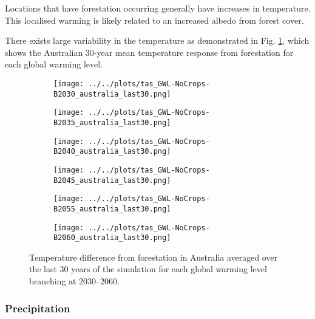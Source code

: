 \documentclass[]{article}
\begin{document}
Locations that have forestation occurring generally have increases in temperature.
This localised warming is likely related to an increased albedo from forest cover.

There exists large variability in the temperature as demonstrated in Fig. \ref{fig:tas_australia}, which shows the Australian 30-year mean temperature response from forestation for each global warming level.

\begin{figure}[H]
    \centering
    \begin{subfigure}[b]{0.4\linewidth}
        \texttt{[image: ../../plots/tas\_GWL-NoCrops-B2030\_australia\_last30.png]}
    \end{subfigure}
    \begin{subfigure}[b]{0.4\linewidth}
        \texttt{[image: ../../plots/tas\_GWL-NoCrops-B2035\_australia\_last30.png]}
    \end{subfigure}
    \begin{subfigure}[b]{0.4\linewidth}
        \texttt{[image: ../../plots/tas\_GWL-NoCrops-B2040\_australia\_last30.png]}
    \end{subfigure}
    \begin{subfigure}[b]{0.4\linewidth}
        \texttt{[image: ../../plots/tas\_GWL-NoCrops-B2045\_australia\_last30.png]}
    \end{subfigure}
    \begin{subfigure}[b]{0.4\linewidth}
        \texttt{[image: ../../plots/tas\_GWL-NoCrops-B2055\_australia\_last30.png]}
    \end{subfigure}
    \begin{subfigure}[b]{0.4\linewidth}
        \texttt{[image: ../../plots/tas\_GWL-NoCrops-B2060\_australia\_last30.png]}
    \end{subfigure}
    \caption{Temperature difference from forestation in Australia averaged over the last 30 years of the simulation for each global warming level branching at 2030–2060.
    }
    \label{fig:tas_australia}
\end{figure}

\subsubsection{Precipitation}
\end{document}
